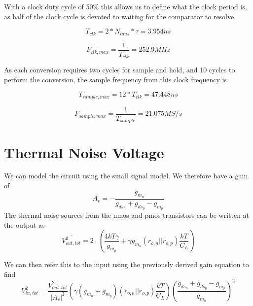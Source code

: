 \documentclass[letterpaper, notitlepage]{revtex4-1}
\begin{document}
  With a clock duty cycle of 50\% this allows us to define what the clock
  period is, as half of the clock cycle is devoted to waiting for the
  comparator to resolve.

  \begin{equation}
    T_{clk} = 2 * N_{taus} * \tau = 3.954ns
  \end{equation}

  \begin{equation}
    F_{clk,max} = \frac{1}{T_{clk}} = 252.9MHz
  \end{equation}

  As each conversion requires two cycles for sample and hold, and 10 cycles
  to perform the conversion, the sample frequency from this clock frequency is

  \begin{equation}
      T_{sample,max} = 12 * T_{clk} = 47.448ns
  \end{equation}

  \begin{equation}
    F_{sample,max} = \frac{1}{T_{sample}} = 21.075 MS/s
  \end{equation}

\section{Thermal Noise Voltage}
We can model the circuit using the small signal model. We therefore have a gain of
\begin{equation}
A_v=-\frac{g_{m_n}}{g_{ds_{n}}+g_{ds_{p}}-g_{m_p}}
\end{equation}
The thermal noise sources from the nmos and pmos transistors can be written at the output as
\begin{equation}
\overline{V_{out,tot}^2}=2\cdot\left(\frac{4kT\gamma}{g_{m_p}}+\gamma g_{m_n}\left(r_{o,n}||r_{o,p}\right)\frac{kT}{C_L}\right)
\end{equation}

We can then refer this to the input using the previously derived gain equation to find
\begin{equation}
\overline{V^2_{in,tot}}=\frac{\overline{V_{out,tot}^2}}{\left|A_v\right|^2}\left(\gamma\left(g_{m_n}+g_{m_p}\right)\left(r_{o,n}||r_{o,p}\right)\frac{kT}{C_L}\right)\left(\frac{g_{ds_{n}}+g_{ds_{p}}-g_{m_p}}{g_{m_n}}\right)^2
\end{equation}
\end{document}
